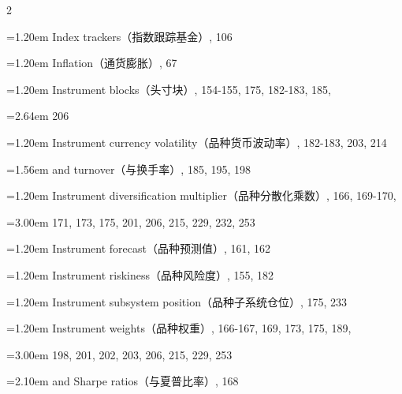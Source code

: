 {\begin{multicols}{2}
\par \noindent\hangindent=1.20em\hspace*{0.00em} Index trackers（指数跟踪基金）, 106
\par \noindent\hangindent=1.20em\hspace*{0.00em} Inflation（通货膨胀）, 67
\par \noindent\hangindent=1.20em\hspace*{0.00em} Instrument blocks（头寸块）, 154-155, 175, 182-183, 185,
\par \noindent\hangindent=2.64em\hspace*{1.44em} 206
\par \noindent\hangindent=1.20em\hspace*{0.00em} Instrument currency volatility（品种货币波动率）, 182-183, 203, 214
\par \noindent\hangindent=1.56em\hspace*{0.36em} and turnover（与换手率）, 185, 195, 198
\par \noindent\hangindent=1.20em\hspace*{0.00em} Instrument diversification multiplier（品种分散化乘数）, 166, 169-170,
\par \noindent\hangindent=3.00em\hspace*{1.80em} 171, 173, 175, 201, 206, 215, 229, 232, 253
\par \noindent\hangindent=1.20em\hspace*{0.00em} Instrument forecast（品种预测值）, 161, 162
\par \noindent\hangindent=1.20em\hspace*{0.00em} Instrument riskiness（品种风险度）, 155, 182
\par \noindent\hangindent=1.20em\hspace*{0.00em} Instrument subsystem position（品种子系统仓位）, 175, 233
\par \noindent\hangindent=1.20em\hspace*{0.00em} Instrument weights（品种权重）, 166-167, 169, 173, 175, 189,
\par \noindent\hangindent=3.00em\hspace*{1.80em} 198, 201, 202, 203, 206, 215, 229, 253
\par \noindent\hangindent=2.10em\hspace*{0.90em} and Sharpe ratios（与夏普比率）, 168

\end{multicols}}
